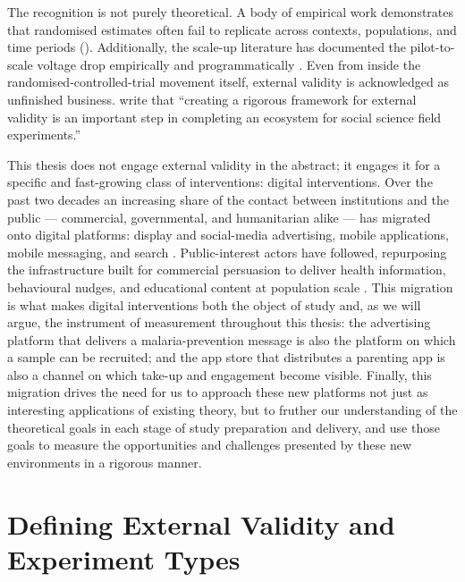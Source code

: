 The recognition is not purely theoretical. A body of empirical work demonstrates that randomised estimates often fail to replicate across contexts, populations, and time periods (\cite{Pritchett2015, Allcott2015, Bisbee2017, Rosenzweig2019}). Additionally, the scale-up literature has documented the pilot-to-scale voltage drop empirically \citep{Bold2018} and programmatically \citep{Muralidharan2017,Al-Ubaydli2020}. Even from inside the randomised-controlled-trial movement itself, external validity is acknowledged as unfinished business. \citet{Snowberg2016} write that ``creating a rigorous framework for external validity is an important step in completing an ecosystem for social science field experiments.''

This thesis does not engage external validity in the abstract; it engages it for a specific and fast-growing class of interventions: digital interventions. Over the past two decades an increasing share of the contact between institutions and the public --- commercial, governmental, and humanitarian alike --- has migrated onto digital platforms: display and social-media advertising, mobile applications, mobile messaging, and search \citep{Goldfarb2019,Aker2010}. Public-interest actors have followed, repurposing the infrastructure built for commercial persuasion \citep{LewisRao2015} to deliver health information, behavioural nudges, and educational content at population scale \citep{Athey2023,Breza2021,Ho2023}. This migration is what makes digital interventions both the object of study and, as we will argue, the instrument of measurement throughout this thesis: the advertising platform that delivers a malaria-prevention message is also the platform on which a sample can be recruited; and the app store that distributes a parenting app is also a channel on which take-up and engagement become visible. Finally, this migration drives the need for us to approach these new platforms not just as interesting applications of existing theory, but to fruther our understanding of the theoretical goals in each stage of study preparation and delivery, and use those goals to measure the opportunities and challenges presented by these new environments in a rigorous manner. 



\section{Defining External Validity and Experiment Types}
\label{sec:intro:definitions}


